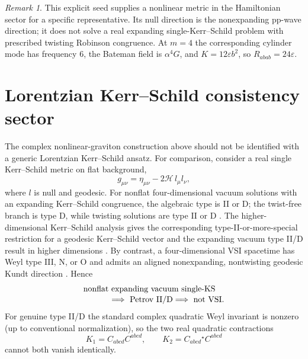 \documentclass[aps,prd,reprint,nofootinbib,superscriptaddress]{revtex4-2}
\theoremstyle{definition}
\theoremstyle{remark}
\newtheorem{remark}[theorem]{Remark}
\newcommand{\eps}{\varepsilon}
\begin{document}
\begin{remark}
This explicit seed supplies a nonlinear metric in the Hamiltonian sector for a specific representative. Its null direction is the nonexpanding pp-wave direction; it does not solve a real expanding single-Kerr--Schild problem with prescribed twisting Robinson congruence. At $m=4$ the corresponding cylinder mode has frequency $6$, the Bateman field is $\alpha^4G$, and $K=12\eps b^2$, so $R_{abab}=24\eps$.
\end{remark}

\section{Lorentzian Kerr--Schild consistency sector}
\label{sec:kerr}

The complex nonlinear-graviton construction above should not be identified with a generic Lorentzian Kerr--Schild ansatz. For comparison, consider a real single Kerr--Schild metric on flat background,
\begin{equation}
g_{\mu\nu}=\eta_{\mu\nu}-2\mathcal H\,l_\mu l_\nu,
\label{eq:KS}
\end{equation}
where $l$ is null and geodesic. For nonflat four-dimensional vacuum solutions with an expanding Kerr--Schild congruence, the algebraic type is II or D; the twist-free branch is type D, while twisting solutions are type II or D \cite{McIntosh1989}.  The higher-dimensional Kerr--Schild analysis gives the corresponding type-II-or-more-special restriction for a geodesic Kerr--Schild vector and the expanding vacuum type II/D result in higher dimensions \cite{Ortaggio2009}. By contrast, a four-dimensional VSI spacetime has Weyl type III, N, or O and admits an aligned nonexpanding, nontwisting geodesic Kundt direction \cite{Coley2004}. Hence
\begin{align}
&\text{nonflat expanding vacuum single-KS}\nonumber\\[-2pt]
&\hspace{1.1cm}\Longrightarrow\ \text{Petrov II/D}
\Longrightarrow\ \text{not VSI}.
\label{eq:KSnotVSI}
\end{align}
For genuine type II/D the standard complex quadratic Weyl invariant is nonzero (up to conventional normalization), so the two real quadratic contractions
\[
K_1=C_{abcd}C^{abcd},
\qquad
K_2=C_{abcd}{}^\star C^{abcd}
\]
cannot both vanish identically.
\end{document}
